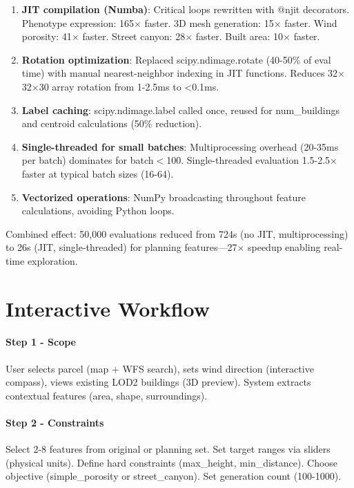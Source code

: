 \documentclass[times,final]{elsarticle}
\begin{document}
\begin{enumerate}
\item \textbf{JIT compilation (Numba)}: Critical loops rewritten with @njit decorators. Phenotype expression: 165$\times$ faster. 3D mesh generation: 15$\times$ faster. Wind porosity: 41$\times$ faster. Street canyon: 28$\times$ faster. Built area: 10$\times$ faster.

\item \textbf{Rotation optimization}: Replaced scipy.ndimage.rotate (40-50\% of eval time) with manual nearest-neighbor indexing in JIT functions. Reduces 32$\times$32$\times$30 array rotation from 1-2.5ms to <0.1ms.

\item \textbf{Label caching}: scipy.ndimage.label called once, reused for num\_buildings and centroid calculations (50\% reduction).

\item \textbf{Single-threaded for small batches}: Multiprocessing overhead (20-35ms per batch) dominates for batch$<$100. Single-threaded evaluation 1.5-2.5$\times$ faster at typical batch sizes (16-64).

\item \textbf{Vectorized operations}: NumPy broadcasting throughout feature calculations, avoiding Python loops.
\end{enumerate}

Combined effect: 50,000 evaluations reduced from 724s (no JIT, multiprocessing) to 26s (JIT, single-threaded) for planning features—27$\times$ speedup enabling real-time exploration.

\section{Interactive Workflow}

\paragraph{Step 1 - Scope}
User selects parcel (map + WFS search), sets wind direction (interactive compass), views existing LOD2 buildings (3D preview). System extracts contextual features (area, shape, surroundings).

\paragraph{Step 2 - Constraints}
Select 2-8 features from original or planning set. Set target ranges via sliders (physical units). Define hard constraints (max\_height, min\_distance). Choose objective (simple\_porosity or street\_canyon). Set generation count (100-1000).
\end{document}
